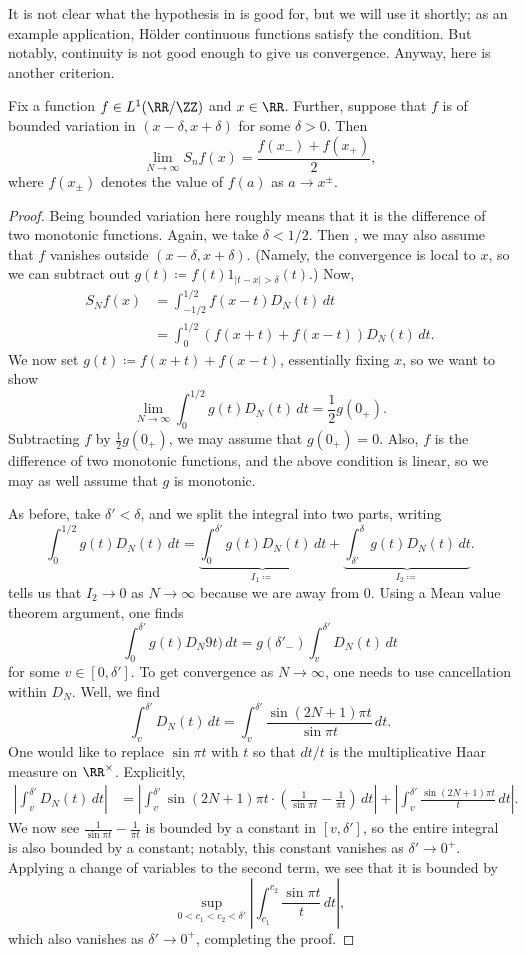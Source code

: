 \documentclass[../notes.tex]{subfiles}
\begin{document}
It is not clear what the hypothesis in  is good for, but we will use it shortly; as an example application, H\"older continuous functions satisfy the condition. But notably, continuity is not good enough to give us convergence. Anyway, here is another criterion.
\begin{theorem} \label{thm:jordan}
	Fix a function $f\in L^1(\RR/\ZZ)$ and $x\in\RR$. Further, suppose that $f$ is of bounded variation in $(x-\delta,x+\delta)$ for some $\delta>0$. Then
	\[\lim_{N\to\infty}S_nf(x)=\frac{f(x_-)+f(x_+)}2,\]
	where $f(x_\pm)$ denotes the value of $f(a)$ as $a\to x^\pm$.
\end{theorem}
\begin{proof}
	Being bounded variation here roughly means that it is the difference of two monotonic functions. Again, we take $\delta<1/2$. Then , we may also assume that $f$ vanishes outside $(x-\delta,x+\delta)$. (Namely, the convergence is local to $x$, so we can subtract out $g(t)\coloneqq f(t)1_{\left|t-x\right|>\delta}(t)$.) Now,
	\begin{align*}
		S_Nf(x) &= \int_{-1/2}^{1/2}f(x-t)D_N(t)\,dt \\
		&= \int_0^{1/2}(f(x+t)+f(x-t))D_N(t)\,dt.
	\end{align*}
	We now set $g(t)\coloneqq f(x+t)+f(x-t)$, essentially fixing $x$, so we want to show
	\[\lim_{N\to\infty}\int_0^{1/2}g(t)D_N(t)\,dt=\frac12g(0_+).\]
	Subtracting $f$ by $\frac12g(0_+)$, we may assume that $g(0_+)=0$. Also, $f$ is the difference of two monotonic functions, and the above condition is linear, so we may as well assume that $g$ is monotonic.

	As before, take $\delta'<\delta$, and we split the integral into two parts, writing
	\[\int_0^{1/2}g(t)D_N(t)\,dt=\underbrace{\int_{0}^{\delta'}g(t)D_N(t)\,dt}_{I_1\coloneqq}+\underbrace{\int_{\delta'}^\delta g(t)D_N(t)\,dt}_{I_2\coloneqq}.\]
	 tells us that $I_2\to0$ as $N\to\infty$ because we are away from $0$. Using a Mean value theorem argument, one finds
	\[\int_0^{\delta'}g(t)D_N9t)\,dt=g(\delta'_-)\int_v^{\delta'}D_N(t)\,dt\]
	for some $v\in[0,\delta']$. To get convergence as $N\to\infty$, one needs to use cancellation within $D_N$. Well, we find
	\[\int_v^{\delta'}D_N(t)\,dt=\int_v^{\delta'}\frac{\sin(2N+1)\pi t}{\sin\pi t}\,dt.\]
	One would like to replace $\sin\pi t$ with $t$ so that $dt/t$ is the multiplicative Haar measure on $\RR^\times$. Explicitly,
	\begin{align*}
		\left|\int_v^{\delta'}D_N(t)\,dt\right| &= \left|\int_v^{\delta'}\sin(2N+1)\pi t\cdot\left(\frac1{\sin\pi t}-\frac1{\pi t}\right)\,dt\right|+\left|\int_v^{\delta'}\frac{\sin(2N+1)\pi t}t\,dt\right|.
	\end{align*}
	We now see $\frac1{\sin\pi t}-\frac1{\pi t}$ is bounded by a constant in $[v,\delta']$, so the entire integral is also bounded by a constant; notably, this constant vanishes as $\delta'\to0^+$. Applying a change of variables to the second term, we see that it is bounded by
	\[\sup_{0<c_1<c_2<\delta'}\left|\int_{c_1}^{c_2}\frac{\sin\pi t}t\,dt\right|,\]
	which also vanishes as $\delta'\to0^+$, completing the proof.
\end{proof}
\end{document}
